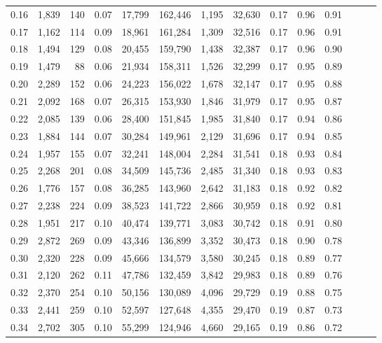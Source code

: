 \begin{tabular}{rrrrrrrrrrrrrr}
0.16 &  1,839 &  140 &  0.07 &   17,799 &  162,446 &   1,195 &  32,630 &  0.17 &  0.96 &      0.91 \\
0.17 &  1,162 &  114 &  0.09 &   18,961 &  161,284 &   1,309 &  32,516 &  0.17 &  0.96 &      0.91 \\
0.18 &  1,494 &  129 &  0.08 &   20,455 &  159,790 &   1,438 &  32,387 &  0.17 &  0.96 &      0.90 \\
0.19 &  1,479 &   88 &  0.06 &   21,934 &  158,311 &   1,526 &  32,299 &  0.17 &  0.95 &      0.89 \\
0.20 &  2,289 &  152 &  0.06 &   24,223 &  156,022 &   1,678 &  32,147 &  0.17 &  0.95 &      0.88 \\
0.21 &  2,092 &  168 &  0.07 &   26,315 &  153,930 &   1,846 &  31,979 &  0.17 &  0.95 &      0.87 \\
0.22 &  2,085 &  139 &  0.06 &   28,400 &  151,845 &   1,985 &  31,840 &  0.17 &  0.94 &      0.86 \\
0.23 &  1,884 &  144 &  0.07 &   30,284 &  149,961 &   2,129 &  31,696 &  0.17 &  0.94 &      0.85 \\
0.24 &  1,957 &  155 &  0.07 &   32,241 &  148,004 &   2,284 &  31,541 &  0.18 &  0.93 &      0.84 \\
0.25 &  2,268 &  201 &  0.08 &   34,509 &  145,736 &   2,485 &  31,340 &  0.18 &  0.93 &      0.83 \\
0.26 &  1,776 &  157 &  0.08 &   36,285 &  143,960 &   2,642 &  31,183 &  0.18 &  0.92 &      0.82 \\
0.27 &  2,238 &  224 &  0.09 &   38,523 &  141,722 &   2,866 &  30,959 &  0.18 &  0.92 &      0.81 \\
0.28 &  1,951 &  217 &  0.10 &   40,474 &  139,771 &   3,083 &  30,742 &  0.18 &  0.91 &      0.80 \\
0.29 &  2,872 &  269 &  0.09 &   43,346 &  136,899 &   3,352 &  30,473 &  0.18 &  0.90 &      0.78 \\
0.30 &  2,320 &  228 &  0.09 &   45,666 &  134,579 &   3,580 &  30,245 &  0.18 &  0.89 &      0.77 \\
0.31 &  2,120 &  262 &  0.11 &   47,786 &  132,459 &   3,842 &  29,983 &  0.18 &  0.89 &      0.76 \\
0.32 &  2,370 &  254 &  0.10 &   50,156 &  130,089 &   4,096 &  29,729 &  0.19 &  0.88 &      0.75 \\
0.33 &  2,441 &  259 &  0.10 &   52,597 &  127,648 &   4,355 &  29,470 &  0.19 &  0.87 &      0.73 \\
0.34 &  2,702 &  305 &  0.10 &   55,299 &  124,946 &   4,660 &  29,165 &  0.19 &  0.86 &      0.72 \\

\end{tabular}
